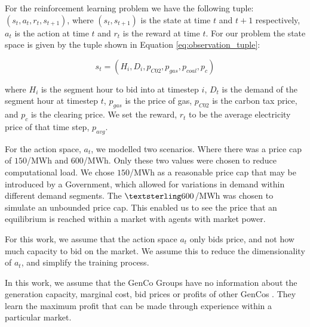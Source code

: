 For the reinforcement learning problem we have the following tuple: $(s_t,a_t,r_t,s_{t+1})$, where $(s_t, s_{t+1})$ is the state at time $t$ and $t+1$ respectively, $a_t$ is the action at time $t$ and $r_t$ is the reward at time $t$. For our problem the state space is given by the tuple shown in Equation \ref{eq:observation_tuple}:

\begin{equation}
\label{eq:observation_tuple}
s_t=(H_i,D_i,p_{C02},p_{gas},p_{coal},p_{c})
\end{equation}

\noindent where $H_i$ is the segment hour to bid into at timestep $i$, $D_t$ is the demand of the segment hour at timestep $t$, $p_{gas}$ is the price of gas, $p_{C02}$ is the carbon tax price, and $p_{c}$ is the clearing price. We set the reward, $r_t$ to be the average electricity price of that time step, $p_{avg}$.

For the action space, $a_t$, we modelled two scenarios. Where there was a price cap of \textsterling$150$/MWh and \textsterling$600$/MWh. Only these two values were chosen to reduce computational load. We chose \textsterling$150$/MWh as a reasonable price cap that may be introduced by a Government, which allowed for variations in demand within different demand segments. The $\textsterling 600$/MWh was chosen to simulate an unbounded price cap. This enabled us to see the price that an equilibrium is reached within a market with agents with market power. 

For this work, we assume that the action space $a_t$ only bids price, and not how much capacity to bid on the market. We assume this to reduce the dimensionality of $a_t$, and simplify the training process.

In this work, we assume that the GenCo Groups have no information about the generation capacity, marginal cost, bid prices or profits of other GenCos \cite{EsmaeiliAliabadi2017}. They learn the maximum profit that can be made through experience within a particular market.





